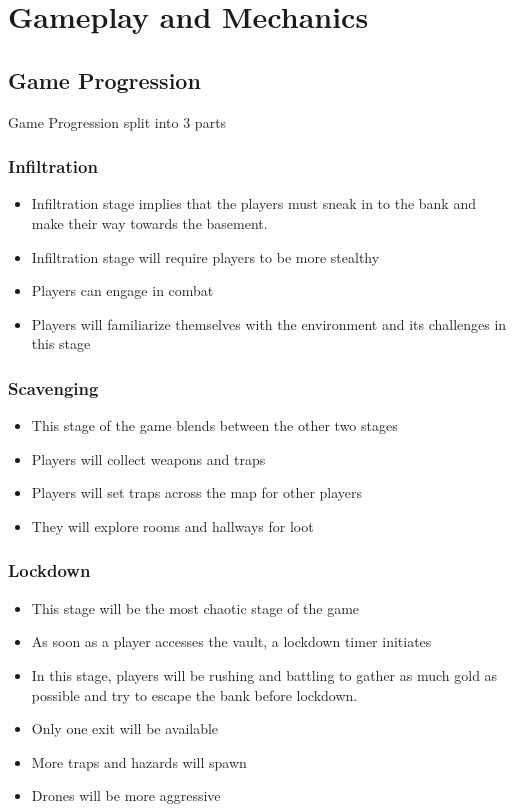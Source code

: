 \documentclass[14pt]{report}
\begin{document}
\chapter{Gameplay and Mechanics}

\section{Game Progression}
Game Progression split into 3 parts

\subsection{Infiltration}
\begin{itemize}
    \item Infiltration stage implies that the players must sneak in to the bank and make their way towards the basement.
    \item Infiltration stage will require players to be more stealthy
    \item Players can engage in combat
    \item Players will familiarize themselves with the environment and its challenges in this stage
\end{itemize}
\subsection{Scavenging}
\begin{itemize}
    \item This stage of the game blends between the other two stages
    \item Players will collect weapons and traps
    \item Players will set traps across the map for other players
    \item They will explore rooms and hallways for loot 
\end{itemize}
\subsection{Lockdown}
\begin{itemize}
    \item This stage will be the most chaotic stage of the game
    \item As soon as a player accesses the vault, a lockdown timer initiates
    \item In this stage, players will be rushing and battling to gather as much gold as possible and try to escape the bank before lockdown.
    \item Only one exit will be available
    \item More traps and hazards will spawn
    \item Drones will be more aggressive
\end{itemize}
\end{document}
